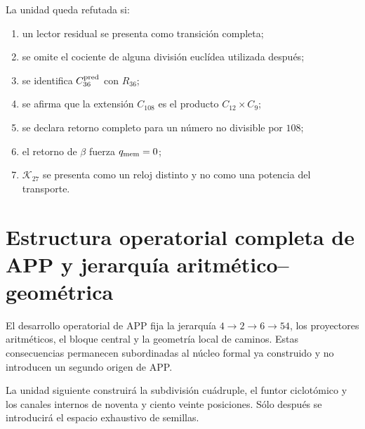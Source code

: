 \begin{criterion}
La unidad queda refutada si:
\begin{enumerate}
 \item un lector residual se presenta como transición completa;
 \item se omite el cociente de alguna división euclídea utilizada después;
 \item se identifica \(C_{36}^{\rm pred}\) con \(R_{36}\);
 \item se afirma que la extensión \(C_{108}\) es el producto
       \(C_{12}\times C_9\);
 \item se declara retorno completo para un número no divisible por \(108\);
 \item el retorno de \(\beta\) fuerza \(q_{\rm mem}=0\);
 \item \(\mathcal K_{27}\) se presenta como un reloj distinto y no como
       una potencia del transporte.
\end{enumerate}
\end{criterion}

\section{Estructura operatorial completa de APP y jerarquía aritmético--geométrica}

El desarrollo operatorial de APP fija la jerarquía
\(4\to2\to6\to54\), los proyectores aritméticos, el bloque central y la
geometría local de caminos. Estas consecuencias permanecen subordinadas al
núcleo formal ya construido y no introducen un segundo origen de APP.

La unidad siguiente construirá la subdivisión cuádruple, el funtor
ciclotómico y los canales internos de noventa y ciento veinte posiciones.
Sólo después se introducirá el espacio exhaustivo de semillas.
